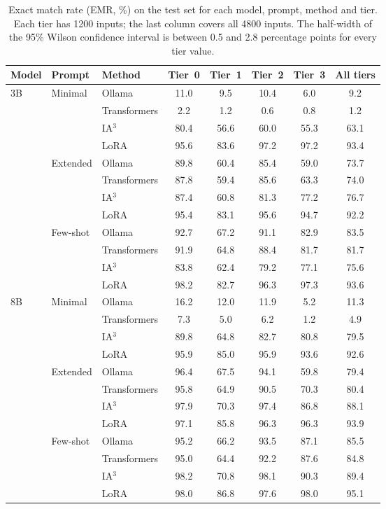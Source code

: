 \documentclass[journal,article,submit,pdftex,moreauthors]{Definitions/mdpi}
\begin{document}
\begin{table}[H]
\caption{Exact match rate (EMR, \%) on the test set for each model, prompt, method and tier. Each tier has 1200 inputs; the last column covers all 4800 inputs. The half-width of the 95\% Wilson confidence interval is between 0.5 and 2.8 percentage points for every tier value.\label{tab:emr}}
\begin{tabularx}{\textwidth}{lllCCCCC}
\toprule
Model & Prompt & Method & Tier~0 & Tier~1 & Tier~2 & Tier~3 & All tiers \\
\midrule
3B & Minimal & Ollama & 11.0 & 9.5 & 10.4 & 6.0 & 9.2 \\
 &  & Transformers & 2.2 & 1.2 & 0.6 & 0.8 & 1.2 \\
 &  & IA$^3$ & 80.4 & 56.6 & 60.0 & 55.3 & 63.1 \\
 &  & LoRA & 95.6 & 83.6 & 97.2 & 97.2 & 93.4 \\
\midrule
 & Extended & Ollama & 89.8 & 60.4 & 85.4 & 59.0 & 73.7 \\
 &  & Transformers & 87.8 & 59.4 & 85.6 & 63.3 & 74.0 \\
 &  & IA$^3$ & 87.4 & 60.8 & 81.3 & 77.2 & 76.7 \\
 &  & LoRA & 95.4 & 83.1 & 95.6 & 94.7 & 92.2 \\
\midrule
 & Few-shot & Ollama & 92.7 & 67.2 & 91.1 & 82.9 & 83.5 \\
 &  & Transformers & 91.9 & 64.8 & 88.4 & 81.7 & 81.7 \\
 &  & IA$^3$ & 83.8 & 62.4 & 79.2 & 77.1 & 75.6 \\
 &  & LoRA & 98.2 & 82.7 & 96.3 & 97.3 & 93.6 \\
\midrule
8B & Minimal & Ollama & 16.2 & 12.0 & 11.9 & 5.2 & 11.3 \\
 &  & Transformers & 7.3 & 5.0 & 6.2 & 1.2 & 4.9 \\
 &  & IA$^3$ & 89.8 & 64.8 & 82.7 & 80.8 & 79.5 \\
 &  & LoRA & 95.9 & 85.0 & 95.9 & 93.6 & 92.6 \\
\midrule
 & Extended & Ollama & 96.4 & 67.5 & 94.1 & 59.8 & 79.4 \\
 &  & Transformers & 95.8 & 64.9 & 90.5 & 70.3 & 80.4 \\
 &  & IA$^3$ & 97.9 & 70.3 & 97.4 & 86.8 & 88.1 \\
 &  & LoRA & 97.1 & 85.8 & 96.3 & 96.3 & 93.9 \\
\midrule
 & Few-shot & Ollama & 95.2 & 66.2 & 93.5 & 87.1 & 85.5 \\
 &  & Transformers & 95.0 & 64.4 & 92.2 & 87.6 & 84.8 \\
 &  & IA$^3$ & 98.2 & 70.8 & 98.1 & 90.3 & 89.4 \\
 &  & LoRA & 98.0 & 86.8 & 97.6 & 98.0 & 95.1 \\
\bottomrule
\end{tabularx}
\end{table}
\end{document}
